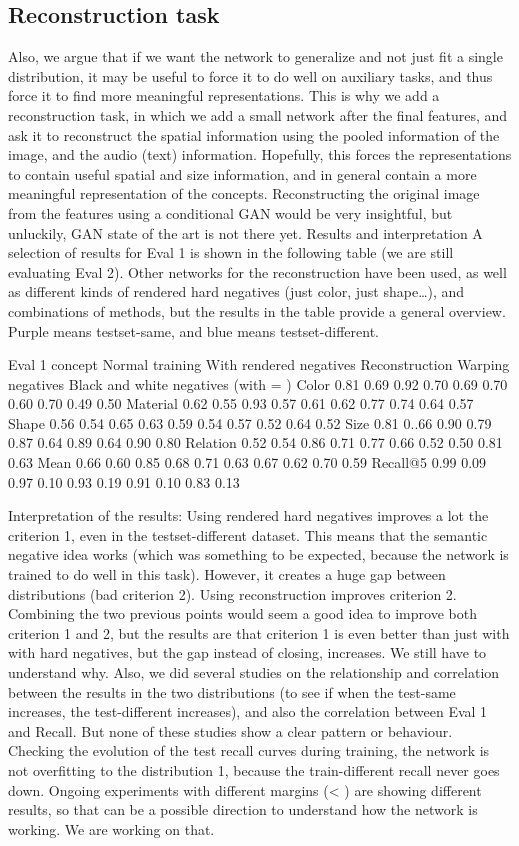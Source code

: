 \subsection{Reconstruction task}
Also, we argue that if we want the network to generalize and not just fit a single distribution, it may be useful to force it to do well on auxiliary tasks, and thus force it to find more meaningful representations. This is why we add a reconstruction task, in which we add a small network after the final features, and ask it to reconstruct the spatial information using the pooled information of the image, and the audio (text) information. Hopefully, this forces the representations to contain useful spatial and size information, and in general contain a more meaningful representation of the concepts.
Reconstructing the original image from the features using a conditional GAN would be very insightful, but unluckily, GAN state of the art is not there yet. 
Results and interpretation
A selection of results for Eval 1 is shown in the following table (we are still evaluating Eval 2). Other networks for the reconstruction have been used, as well as different kinds of rendered hard negatives (just color, just shape…), and combinations of methods, but the results in the table provide a general overview. Purple means testset-same, and blue means testset-different.

Eval 1 concept
Normal training
With rendered negatives
Reconstruction
Warping negatives
Black and white negatives (with = )
Color
0.81
0.69
0.92
0.70
0.69
0.70
0.60
0.70
0.49
0.50
Material
0.62
0.55
0.93
0.57
0.61
0.62
0.77
0.74
0.64
0.57
Shape
0.56
0.54
0.65
0.63
0.59
0.54
0.57
0.52
0.64
0.52
Size
0.81
0..66
0.90
0.79
0.87
0.64
0.89
0.64
0.90
0.80
Relation
0.52
0.54
0.86
0.71
0.77
0.66
0.52
0.50
0.81
0.63
Mean
0.66
0.60
0.85
0.68
0.71
0.63
0.67
0.62
0.70
0.59
Recall@5
0.99
0.09
0.97
0.10
0.93
0.19
0.91
0.10
0.83
0.13

Interpretation of the results:
Using rendered hard negatives improves a lot the criterion 1, even in the testset-different dataset. This means that the semantic negative idea works (which was something to be expected, because the network is trained to do well in this task). However, it creates a huge gap between distributions (bad criterion 2).
Using reconstruction improves criterion 2.
Combining the two previous points would seem a good idea to improve both criterion 1 and 2, but the results are that criterion 1 is even better than just with with hard negatives, but the gap instead of closing, increases. We still have to understand why.
Also, we did several studies on the relationship and correlation between the results in the two distributions (to see if when the test-same increases, the test-different increases), and also the correlation between Eval 1 and Recall. But none of these studies show a clear pattern or behaviour.
Checking the evolution of the test recall curves during training, the network is not overfitting to the distribution 1, because the train-different recall never goes down. 
Ongoing experiments with different margins (< ) are showing different results, so that can be a possible direction to understand how the network is working. We are working on that.

